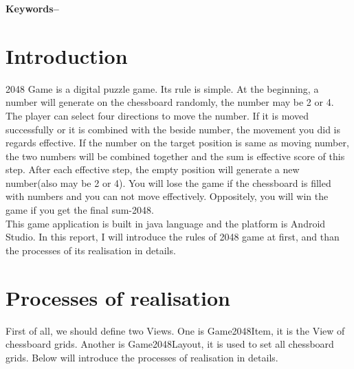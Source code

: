 \documentclass[10pt, a4paper]{article}
\title{\mytitle}
\author{\myauthor\hspace{1em}\\\contact\\Edinburgh Napier University\hspace{0.5em}-\hspace{0.5em}\mymodule}
\date{}
\begin{document}
	\maketitle
	\begin{abstract}
	    With time goes, people's material life level is increasing day by day, more and more people are in pursuit of high quality of life. One specific reflect is various categories of mobile apps. In recent years, technology of mobile have made great progress. Mobile apps have become an important part of people's daily life. These applications are in various industries and fields because they have different functions. For example,on the one hand, people can use mobile applications to pay products, book a taxi or restaurant, and they are also helpful on working field. On the other hand, there are many entertainment applications for people to relax. The entertainment applications are an integral pare of people's lives, especially in the fast pace society. In summary, an entertainment application-2048 game is select to build. 
		\lipsum[2]
	\end{abstract}
    
	\textbf{Keywords--}{\mykeywords}

	\section{Introduction}
    2048 Game is a digital puzzle game. Its rule is simple. At the beginning, a number will generate on the chessboard randomly, the number may be 2 or 4. The player can select four directions to move the number. If it is moved successfully or it is combined with the beside number, the movement you did is regards effective. If the number on the target position is same as moving number, the two numbers will be combined together and the sum is effective score of this step. After each effective step, the empty position will generate a new number(also may be 2 or 4). You will lose the game if the chessboard is filled with numbers and you can not move effectively. Oppositely, you will win the game if you get the final sum-2048. \\ This game application is built in java language and the platform is Android Studio. In this report, I will introduce the rules of 2048 game at first, and than the processes of its realisation in details.
    
    
   
	\section{Processes of realisation}
	First of all, we should define two Views. One is Game2048Item, it is the View of chessboard grids. Another is Game2048Layout, it is used to set all chessboard grids. Below will introduce the processes of realisation in details.
\end{document}
